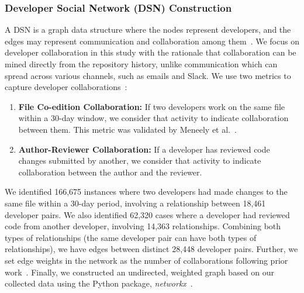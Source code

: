 \documentclass[10pt,journal,compsoc]{IEEEtran}
\begin{document}
\subsubsection{Developer Social Network (DSN) Construction}





A DSN is a graph data structure where the nodes represent developers, and the edges may represent communication and collaboration among them~\cite{herbold2021systematic}. We focus on developer collaboration in this study with the rationale that collaboration can be mined directly from the repository history, unlike communication which can spread across various channels, such as emails and Slack. We use two metrics to capture developer collaborations~\cite{kerzazi2016can, meneely2011socio}:

\begin{enumerate}
    \item \textbf{File Co-edition Collaboration:} If two developers work on the same file within a 30-day window, we consider that activity to indicate collaboration between them. This metric was validated by Meneely et al.~\cite{meneely2011socio}.

    \item \textbf{Author-Reviewer Collaboration:}  If a developer has reviewed code changes submitted by another, we consider that activity to indicate collaboration between the author and the reviewer. 
\end{enumerate}

We identified 166,675 instances where two developers had made changes to the same file within a 30-day period, involving a relationship between 18,461 developer pairs. We also identified 62,320 cases where a developer had reviewed code from another developer, involving 14,363 relationships. Combining both types of relationships (the same developer pair can have both types of relationships), we have edges between distinct 28,448 developer pairs. Further, we set edge weights in the network as the number of collaborations following prior work~\cite{kerzazi2016can, meneely2011socio}. Finally, we constructed an undirected, weighted graph based on our collected data using the Python package, \textit{networkx}~\cite{hagberg2020networkx}.
\end{document}
